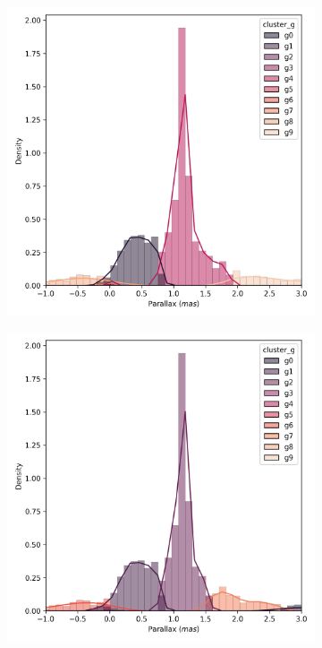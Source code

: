 \documentclass[preprint,12pt,authoryear]{elsarticle}
\begin{document}
\begin{figure}[!hbt]
  \begin{subfigure}{0.29\textwidth}
    \includegraphics[width=\textwidth]{../figures/ngc_2682/kmeans_parallax_ngc_2682.png}
  \end{subfigure}
  \begin{subfigure}{0.29\textwidth}
    \includegraphics[width=\textwidth]{../figures/ngc_2682/dec_parallax_ngc_2682.png}

\end{subfigure}
\end{figure}
\end{document}
